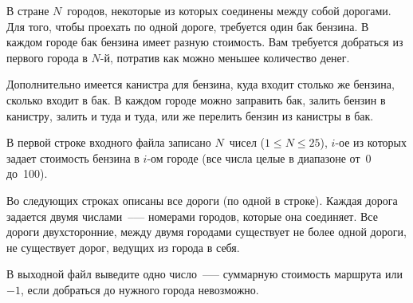 В стране $N$~городов, некоторые из которых соединены между собой дорогами. 
Для того, чтобы проехать по одной дороге, требуется один бак бензина. 
В каждом городе бак бензина имеет разную стоимость. Вам требуется добраться 
из первого города в $N$-й, потратив как можно меньшее количество денег.



Дополнительно имеется канистра для бензина, куда входит столько же бензина,
сколько входит в бак. В каждом городе можно заправить бак, залить 
бензин в канистру, залить и туда и туда, или же перелить бензин 
из канистры в бак.

\InputFile
В первой строке входного файла записано $N$~чисел ($1\le N\le 25$), 
$i$-ое из которых задает стоимость бензина в $i$-ом городе 
(все числа целые в диапазоне от~0 до~100). 

Во следующих строках описаны все дороги (по одной в строке).
Каждая дорога задается двумя числами~--— номерами городов, 
которые она соединяет. Все дороги двухсторонние, между двумя городами
существует не более одной дороги, не существует дорог, ведущих 
из города в себя.

\OutputFile
В выходной файл выведите одно число~--— суммарную стоимость маршрута 
или $-1$, если добраться до нужного города невозможно.
